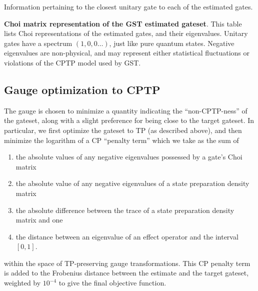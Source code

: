 {\begin{table}[h]
\begin{center}
\caption{Information pertaining to the closest unitary gate to each of the estimated gates.\label{bestTPGatesetClosestUnitaryTable}}
\end{center}
\end{table}


\begin{table}[h]
\begin{center}
\caption{\textbf{Choi matrix representation of the GST estimated gateset}.  This table lists Choi representations of the estimated gates, and their eigenvalues.  Unitary gates have a spectrum $(1,0,0\ldots)$, just like pure quantum states.  Negative eigenvalues are non-physical, and may represent either statistical fluctuations or violations of the CPTP model used by GST.\label{bestTPGatesetChoiTable}}
\end{center}
\end{table}

\clearpage

\subsection{Gauge optimization to CPTP}
The gauge is chosen to minimize a quantity indicating the ``non-CPTP-ness'' of the gateset, along with a slight preference for being close to the target gateset.  In particular, we first optimize the gateset to TP (as described above), and then minimize the logarithm of a CP ``penalty term'' which we take as the sum of
\begin{enumerate}
\item the absolute values of any negative eigenvalues possessed by a gate's Choi matrix
\item the absolute value of any negative eigenvalues of a state preparation density matrix
\item the absolute difference between the trace of a state preparation density matrix and one
\item the distance between an eigenvalue of an effect operator and the interval $[0,1]$.
\end{enumerate}
within the space of TP-preserving gauge transformations.  This CP penalty term is added to the Frobenius distance between the estimate and the target gateset, weighted by $10^{-4}$ to give the final objective function.

}
